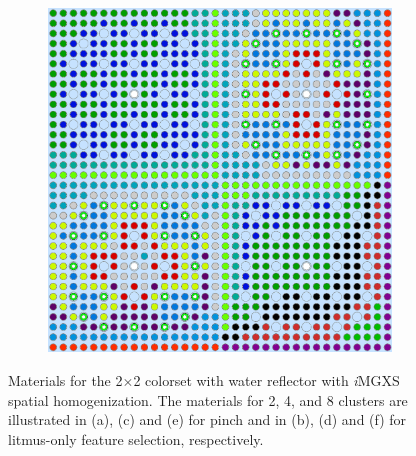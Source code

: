 \begin{figure}[h!]
\begin{subfigure}{0.47\textwidth}
  \caption{}
  \label{fig:chap10-reflector-pinch-8}
\end{subfigure}%
\begin{subfigure}{0.47\textwidth}
  \centering
  \includegraphics[width=0.9\linewidth]{figures/unsupervised/geometries/with-features/8-clusters/combined/reflector}
  \caption{}
  \label{fig:chap10-reflector-combined-8}
\end{subfigure}
\caption[Materials for the 2$\times$2 colorset with reflector with \textit{i}\ac{MGXS} homogenization]{Materials for the 2$\times$2 colorset with water reflector with \textit{i}\ac{MGXS} spatial homogenization. The materials for 2, 4, and 8 clusters are illustrated in (a), (c) and (e) for pinch and in (b), (d) and (f) for litmus-only feature selection, respectively.}
\label{fig:chap10-reflector-geometries}
\end{figure}

\clearpage

